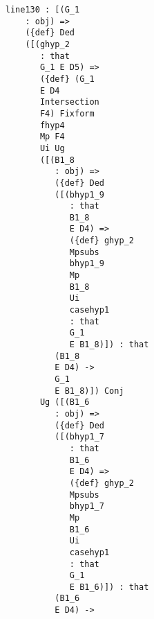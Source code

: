 \documentclass[12pt]{article}
\begin{document}
\begin{verbatim}
                              line130 : [(G_1 
                                  : obj) => 
                                  ({def} Ded 
                                  ([(ghyp_2 
                                     : that 
                                     G_1 E D5) => 
                                     ({def} (G_1 
                                     E D4 
                                     Intersection 
                                     F4) Fixform 
                                     fhyp4 
                                     Mp F4 
                                     Ui Ug 
                                     ([(B1_8 
                                        : obj) => 
                                        ({def} Ded 
                                        ([(bhyp1_9 
                                           : that 
                                           B1_8 
                                           E D4) => 
                                           ({def} ghyp_2 
                                           Mpsubs 
                                           bhyp1_9 
                                           Mp 
                                           B1_8 
                                           Ui 
                                           casehyp1 
                                           : that 
                                           G_1 
                                           E B1_8)]) : that 
                                        (B1_8 
                                        E D4) -> 
                                        G_1 
                                        E B1_8)]) Conj 
                                     Ug ([(B1_6 
                                        : obj) => 
                                        ({def} Ded 
                                        ([(bhyp1_7 
                                           : that 
                                           B1_6 
                                           E D4) => 
                                           ({def} ghyp_2 
                                           Mpsubs 
                                           bhyp1_7 
                                           Mp 
                                           B1_6 
                                           Ui 
                                           casehyp1 
                                           : that 
                                           G_1 
                                           E B1_6)]) : that 
                                        (B1_6 
                                        E D4) -> 

\end{verbatim}
\end{document}
